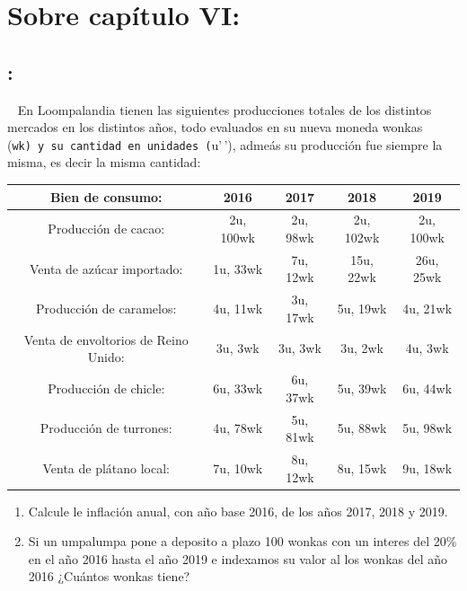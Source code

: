 \documentclass[
  letterpaper,
  DIV=11,
  numbers=noendperiod]{scrreport}
\providecommand{\tightlist}{%
  \setlength{\itemsep}{0pt}\setlength{\parskip}{0pt}}\usepackage{longtable,booktabs,array}
\begin{document}
\hypertarget{sobre-capuxedtulo-vi}{%
\section{Sobre capítulo VI:}\label{sobre-capuxedtulo-vi}}

\hypertarget{section-19}{%
\subsection{:}\label{section-19}}

~ En Loompalandia tienen las siguientes producciones totales de los
distintos mercados en los distintos años, todo evaluados en su nueva
moneda wonkas
(\texttt{wk\textquotesingle{}\textquotesingle{})\ y\ su\ cantidad\ en\ unidades\ (}u'\,'),
admeás su producción fue siempre la misma, es decir la misma cantidad:

\begin{table}[h]
    \centering
    \begin{tabular}{|c|c|c|c|c|}
        \hline
        Bien de consumo: & 2016 & 2017 & 2018 & 2019 \\\hline
        Producción de cacao: & 2u, 100wk & 2u, 98wk & 2u, 102wk & 2u, 100wk \\\hline
        Venta de azúcar importado: & 1u, 33wk & 7u, 12wk & 15u, 22wk & 26u, 25wk\\\hline
        Producción de caramelos: & 4u, 11wk & 3u, 17wk & 5u, 19wk & 4u, 21wk\\\hline
        Venta de envoltorios de Reino Unido: & 3u, 3wk & 3u, 3wk & 3u, 2wk & 4u, 3wk\\\hline
        Producción de chicle: & 6u, 33wk & 6u, 37wk & 5u, 39wk & 6u, 44wk\\\hline
        Producción de turrones: & 4u, 78wk & 5u, 81wk & 5u, 88wk & 5u, 98wk\\\hline
        Venta de plátano local: & 7u, 10wk & 8u, 12wk & 8u, 15wk & 9u, 18wk\\\hline
    \end{tabular}
\end{table}

\begin{enumerate}
\def\labelenumi{\arabic{enumi})}
\tightlist
\item
  Calcule le inflación anual, con año base 2016, de los años 2017, 2018
  y 2019.
\item
  Si un umpalumpa pone a deposito a plazo 100 wonkas con un interes del
  20\% en el año 2016 hasta el año 2019 e indexamos su valor al los
  wonkas del año 2016 ¿Cuántos wonkas tiene?
\end{enumerate}
\end{document}
